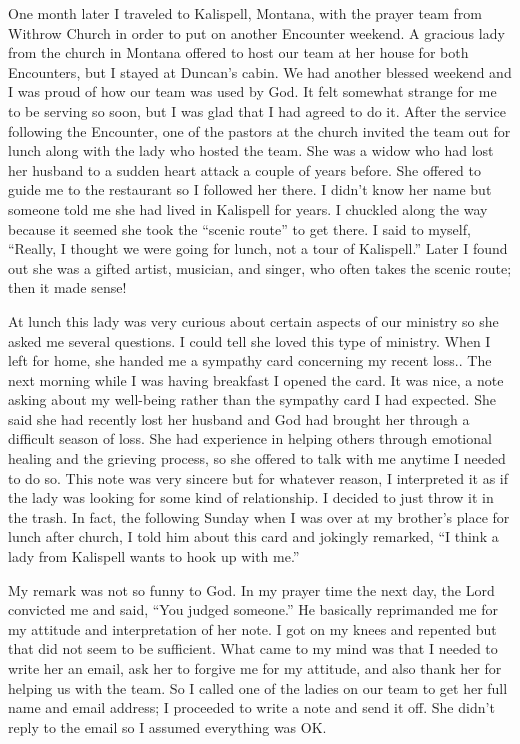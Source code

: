 \documentclass[twoside, 12pt]{book}
\begin{document}
One month later I traveled to Kalispell, Montana, with the prayer team from Withrow Church in order to put on another Encounter weekend. A gracious lady from the church in Montana offered to host our team at her house for both Encounters, but I stayed at Duncan’s cabin. We had another blessed weekend and I was proud of how our team was used by God. It felt somewhat strange for me to be serving so soon, but I was glad that I had agreed to do it. After the  service following the Encounter, one of the pastors at the church invited the team out for lunch along with the lady who hosted the team. She was a widow who had lost her husband to a sudden heart attack a couple of years before. She offered to guide me to the restaurant so I followed her there. I didn’t know her name but someone told me she had lived in Kalispell for years. I chuckled along the way because it seemed she took the “scenic route” to get there. I said to myself, “Really, I thought we were going for lunch, not a tour of Kalispell.” Later I found out she was a gifted artist, musician, and singer, who often takes the scenic route; then it made sense! 

At lunch this lady was very curious about certain aspects of our ministry so she asked me several questions. I could tell she loved this type of ministry. When I left for home, she handed me a sympathy card concerning my recent loss.. The next morning while I was having breakfast I opened the card. It was nice, a note asking about my well-being rather than the sympathy card I had expected. She said she had recently lost her husband and God had brought her through a difficult season of loss. She had experience in helping others through emotional healing and the grieving process, so she offered to talk with me anytime I needed to do so. This note was very sincere but for whatever reason, I interpreted it as if the lady was looking for some kind of relationship. I decided to just throw it in the trash. In fact, the following Sunday when I was over at my brother’s place for lunch after church, I told him about this card and jokingly remarked, “I think a lady from Kalispell wants to hook up with me.” 

My remark was not so funny to God. In my prayer time the next day, the Lord convicted me and said, “You judged someone.” He basically reprimanded me for my attitude and interpretation of her note. I got on my knees and repented but that did not seem to be sufficient. What came to my mind was that I needed to write her an email, ask her to forgive me for my attitude, and also thank her for helping us with the team. So I called one of the ladies on our team to get her full name and email address; I proceeded to write a note and send it off. She didn’t reply to the email so I assumed everything was OK.
\end{document}
